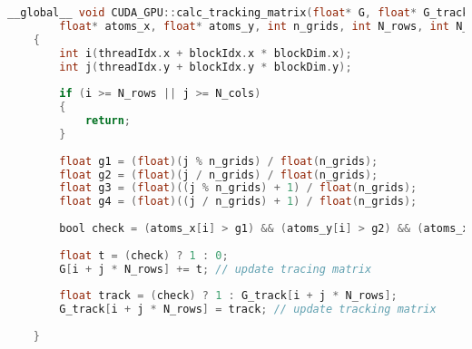 \begin{lstlisting}[language=C]
    __global__ void CUDA_GPU::calc_tracking_matrix(float* G, float* G_track, 
        float* atoms_x, float* atoms_y, int n_grids, int N_rows, int N_cols)
    {
        int i(threadIdx.x + blockIdx.x * blockDim.x);
        int j(threadIdx.y + blockIdx.y * blockDim.y);
    
        if (i >= N_rows || j >= N_cols) 
        {
            return;
        }
    
        float g1 = (float)(j % n_grids) / float(n_grids);
        float g2 = (float)(j / n_grids) / float(n_grids);
        float g3 = (float)((j % n_grids) + 1) / float(n_grids);
        float g4 = (float)((j / n_grids) + 1) / float(n_grids);
    
        bool check = (atoms_x[i] > g1) && (atoms_y[i] > g2) && (atoms_x[i] <= g3) && (atoms_y[i] <= g4);
    
        float t = (check) ? 1 : 0;
        G[i + j * N_rows] += t; // update tracing matrix
    
        float track = (check) ? 1 : G_track[i + j * N_rows];
        G_track[i + j * N_rows] = track; // update tracking matrix
    
    }
\end{lstlisting}